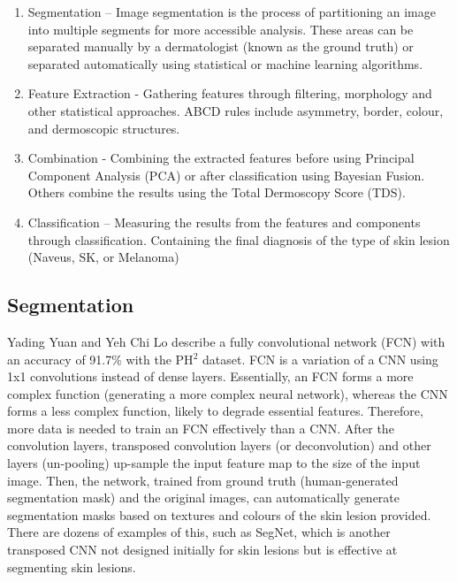 \begin{enumerate}
	
	\item Segmentation – Image segmentation is the process of partitioning an image into multiple segments for more accessible analysis. These areas can be separated manually by a dermatologist (known as the ground truth) or separated automatically using statistical or machine learning algorithms.
	
	\item Feature Extraction - Gathering features through filtering, morphology and other statistical approaches. ABCD rules include asymmetry, border, colour, and dermoscopic structures.

	\item Combination - Combining the extracted features before using Principal Component Analysis (PCA) or after classification using Bayesian Fusion. Others combine the results using the Total Dermoscopy Score (TDS).
	
	\item Classification – Measuring the results from the features and components through classification. Containing the final diagnosis of the type of skin lesion (Naveus, SK, or Melanoma)

\end{enumerate}

\subsection{Segmentation}
Yading Yuan and Yeh Chi Lo describe a fully convolutional network (FCN) with an accuracy of 91.7\% with the PH$^2$ dataset\cite{Yuan2017a}. FCN is a variation of a CNN using 1x1 convolutions instead of dense layers. Essentially, an FCN forms a more complex function (generating a more complex neural network), whereas the CNN forms a less complex function, likely to degrade essential features. Therefore, more data is needed to train an FCN effectively than a CNN. After the convolution layers, transposed convolution layers (or deconvolution) and other layers (un-pooling) up-sample the input feature map to the size of the input image. Then, the network, trained from ground truth (human-generated segmentation mask) and the original images, can automatically generate segmentation masks based on textures and colours of the skin lesion provided. There are dozens of examples of this, such as SegNet\cite{Badrinarayanan2017}, which is another transposed CNN not designed initially for skin lesions but is effective at segmenting skin lesions.


